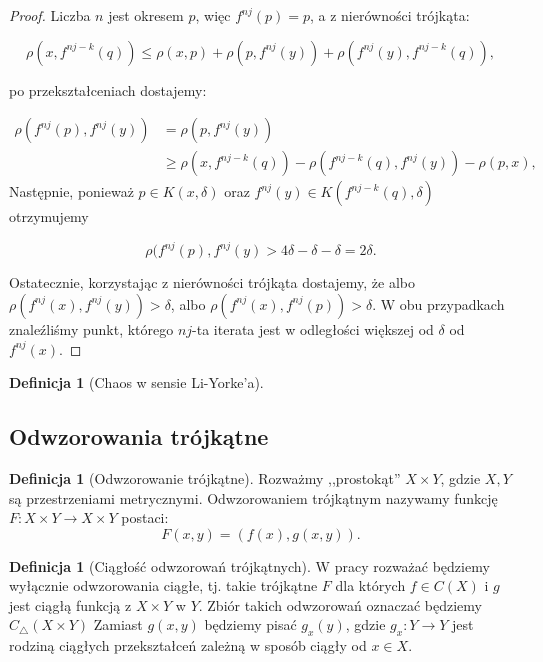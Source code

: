 \documentclass[licencjacka]{pwr_wmat_praca_dyplomowa}
\theoremstyle{plain}
\numberwithin{theorem}{chapter}
\theoremstyle{definition}
\numberwithin{theorem}{chapter}
\newtheorem{definition}[theorem]{Definicja}
\begin{document}
\begin{proof}
Liczba $n$ jest okresem $p$, więc $f^{nj}(p) = p$, a z nierówności trójkąta:

$$\rho(x, f^{nj-k}(q)) \leq \rho(x, p) + \rho(p, f^{nj}(y)) + \rho(f^{nj}(y), f^{nj-k}(q)),$$

po przekształceniach dostajemy:

\begin{equation}
\begin{aligned}
\rho(f^{nj}(p), f^{nj}(y)) & = \rho(p, f^{nj}(y)) \\
& \geq \rho(x, f^{nj-k}(q)) - \rho(f^{nj-k}(q), f^{nj}(y)) - \rho(p, x),
\end{aligned}
\end{equation}
Następnie, ponieważ $p \in K(x, \delta)$ oraz $f^{nj}(y) \in K(f^{nj-k}(q), \delta)$ otrzymujemy

$$\rho(f^{nj}(p), f^{nj}(y) > 4\delta - \delta - \delta = 2\delta.$$

Ostatecznie, korzystając z nierówności trójkąta dostajemy, że albo $\rho(f^{nj}(x), f^{nj}(y)) > \delta$, albo $\rho(f^{nj}(x), f^{nj}(p)) > \delta.$ W obu przypadkach znaleźliśmy punkt, którego $nj$-ta iterata jest w odległości większej od $\delta$ od $f^{nj}(x).$
\end{proof}



\begin{definition}[Chaos w sensie Li-Yorke'a]
\end{definition}



\subsection{Odwzorowania trójkątne}


\begin{definition}[Odwzorowanie trójkątne]
Rozważmy ,,prostokąt'' $X \times Y$, gdzie $X, Y$ są przestrzeniami metrycznymi. 
Odwzorowaniem trójkątnym nazywamy funkcję $F: X \times Y \rightarrow X \times Y$ postaci:
$$F(x,y) = (f(x), g(x,y)).$$
\end{definition}


\begin{definition}[Ciągłość odwzorowań trójkątnych]
W pracy rozważać będziemy wyłącznie odwzorowania ciągłe, tj. takie trójkątne $F$ dla których $f \in C(X)$ i $g$ jest ciągłą funkcją z $X \times Y$ w $Y$. 
Zbiór takich odwzorowań oznaczać będziemy $C_\triangle(X \times Y)$
Zamiast $g(x, y)$ będziemy pisać $g_x(y)$, gdzie $g_x: Y \rightarrow Y$ jest rodziną ciągłych przekształceń zależną w sposób ciągły od $x \in X$.
\end{definition}
\end{document}
